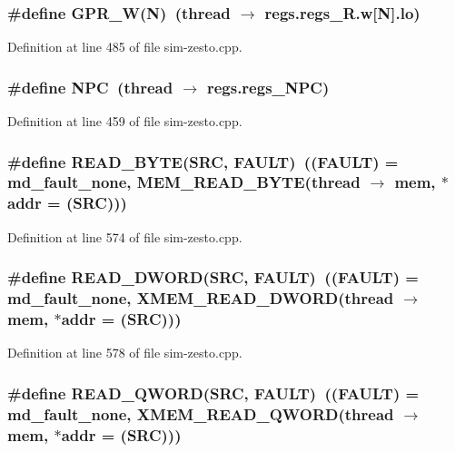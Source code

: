 \subsubsection[{GPR\_\-W}]{\setlength{\rightskip}{0pt plus 5cm}\#define GPR\_\-W(N)~(thread $\rightarrow$ regs.regs\_\-R.w[N].lo)}\label{sim-zesto_8cpp_49937247dbcf35e59ac3a4103e47259f}




Definition at line 485 of file sim-zesto.cpp.
\subsubsection[{NPC}]{\setlength{\rightskip}{0pt plus 5cm}\#define NPC~(thread $\rightarrow$ regs.regs\_\-NPC)}\label{sim-zesto_8cpp_6bc40f3f63777e2bd9deb13953e38b2d}




Definition at line 459 of file sim-zesto.cpp.
\subsubsection[{READ\_\-BYTE}]{\setlength{\rightskip}{0pt plus 5cm}\#define READ\_\-BYTE(SRC, \/  FAULT)~((FAULT) = md\_\-fault\_\-none, MEM\_\-READ\_\-BYTE(thread $\rightarrow$ mem, $\ast$addr = (SRC)))}\label{sim-zesto_8cpp_2967bbef616af8861c316b12b5ca3203}




Definition at line 574 of file sim-zesto.cpp.
\subsubsection[{READ\_\-DWORD}]{\setlength{\rightskip}{0pt plus 5cm}\#define READ\_\-DWORD(SRC, \/  FAULT)~((FAULT) = md\_\-fault\_\-none, XMEM\_\-READ\_\-DWORD(thread $\rightarrow$ mem, $\ast$addr = (SRC)))}\label{sim-zesto_8cpp_a2ff7b45c340039544196f5da2de752b}




Definition at line 578 of file sim-zesto.cpp.
\subsubsection[{READ\_\-QWORD}]{\setlength{\rightskip}{0pt plus 5cm}\#define READ\_\-QWORD(SRC, \/  FAULT)~((FAULT) = md\_\-fault\_\-none, XMEM\_\-READ\_\-QWORD(thread $\rightarrow$ mem, $\ast$addr = (SRC)))}\label{sim-zesto_8cpp_7c5f5d585d91dff10f5b6ca754b421f6}




